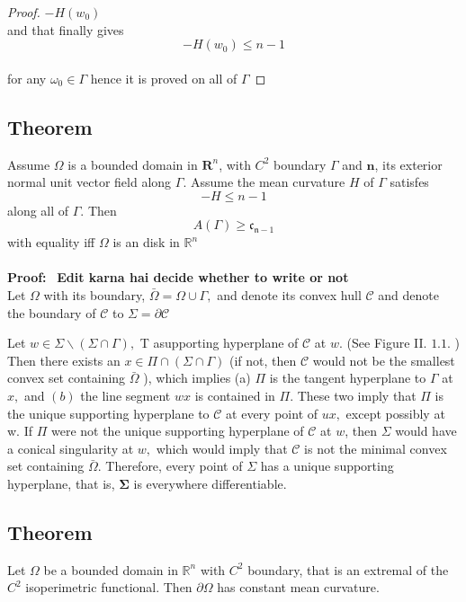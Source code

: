 \documentclass[oneside]{book}
\begin{document}
\begin{proof}
$ -H\left(w_{0}\right )$ \\

  and that finally gives
  \\
   $$ -H(w_{0})\leq n-1 $$ \\
    for any $ \omega_{0} \in \Gamma$ hence it is proved on all of $\Gamma$ 
\end{proof}





\subsection{Theorem}
Assume $\Omega$ is a bounded domain in $\mathbf{R}^{n}$, with $C^{2}$ boundary $\Gamma$
and $\mathbf{n}$, its exterior normal unit vector field along $\Gamma$. Assume the mean curvature
$H$ of $\Gamma$ satisfes
$$
-H \leq n-1
$$
along all of $\Gamma$. Then
$$
A(\Gamma) \geq \mathfrak{c}_{\mathfrak{n}-1}
$$
with equality iff $\Omega$ is an disk in $\mathbb{R}^{n}$ \\\\
\textbf{Proof:} \ \textbf{Edit karna hai decide whether to write or not }\\

 Let $\Omega$ with its boundary,  $\bar{\Omega} =\Omega \cup \Gamma,$ and denote its convex hull  $\mathcal{C}$  and denote the boundary of $\mathcal{C}$  to $\Sigma=\partial \mathcal{C}$ 

Let $w \in \Sigma \backslash(\Sigma \cap \Gamma),$ T asupporting hyperplane of $\mathcal{C}$ at $w$. (See Figure II. $1.1 .$ ) Then there exists an $x \in \Pi \cap(\Sigma \cap \Gamma)$ (if not, then $\mathcal{C}$ would not be the smallest convex set containing $\bar{\Omega}$ ), which implies (a) $\Pi$ is the tangent hyperplane to $\Gamma$
at $x,$ and $(b)$ the line segment $w x$ is contained in $\Pi$. These two imply that $\Pi$ is the unique supporting hyperplane to $\mathcal{C}$ at every point of $u x,$ except possibly at
w. If $\Pi$ were not the unique supporting hyperplane of $\mathcal{C}$ at $w$, then $\Sigma$ would have a conical singularity at $w,$ which would imply that $\mathcal{C}$ is not the minimal convex set containing $\bar{\Omega}$. Therefore, every point of $\Sigma$ has a unique supporting hyperplane, that is, $\boldsymbol{\Sigma}$ is everywhere differentiable.



\subsection{Theorem}
 Let $\Omega$ be a bounded domain in $\mathbb{R}^{n}$ with $C^{2}$ boundary, that is an extremal of the $C^{2}$ isoperimetric functional. Then  $\partial \Omega$ has constant mean curvature.
\end{document}
